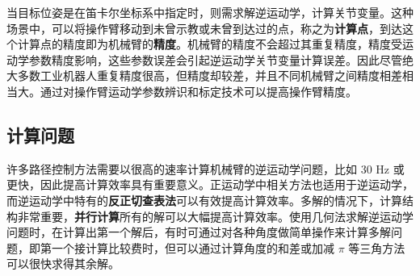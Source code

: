 \documentclass[cn,11pt,chinese,blue,bibstyle=ieeetr]{elegantbook}
\begin{document}
当目标位姿是在笛卡尔坐标系中指定时，则需求解逆运动学，计算关节变量。这种场景中，可以将操作臂移动到未曾示教或未曾到达过的点，称之为\textbf{计算点}，到达这个计算点的精度即为机械臂的\textbf{精度}。机械臂的精度不会超过其重复精度，精度受运动学参数精度影响，这些参数误差会引起逆运动学关节变量计算误差。因此尽管绝大多数工业机器人重复精度很高，但精度却较差，并且不同机械臂之间精度相差相当大。通过对操作臂运动学参数辨识和标定技术可以提高操作臂精度。


\subsection{计算问题}
许多路径控制方法需要以很高的速率计算机械臂的逆运动学问题，比如 30 Hz 或更快，因此提高计算效率具有重要意义。正运动学中相关方法也适用于逆运动学，而逆运动学中特有的\textbf{反正切查表法}可以有效提高计算效率。多解的情况下，计算结构非常重要，\textbf{并行计算}所有的解可以大幅提高计算效率。使用几何法求解逆运动学问题时，在计算出第一个解后，有时可通过对各种角度做简单操作来计算多解问题，即第一个接计算比较费时，但可以通过计算角度的和差或加减 $\pi$ 等三角方法可以很快求得其余解。
\end{document}
